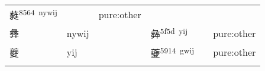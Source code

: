 \documentclass[14pt,a4paper]{scrartcl}
\begin{document}
\begin{longtable}[c]{@{}llllll@{}}
\begin{minipage}[t]{0.14\columnwidth}\raggedright\strut
蕤\textsuperscript{8564~nywij}
\strut\end{minipage} &
\begin{minipage}[t]{0.14\columnwidth}\raggedright\strut
\strut\end{minipage} &
\begin{minipage}[t]{0.14\columnwidth}\raggedright\strut
pure:other
\strut\end{minipage}\tabularnewline
\begin{minipage}[t]{0.14\columnwidth}\raggedright\strut
彝
\strut\end{minipage} &
\begin{minipage}[t]{0.14\columnwidth}\raggedright\strut
nywij
\strut\end{minipage} &
\begin{minipage}[t]{0.14\columnwidth}\raggedright\strut
\strut\end{minipage} &
\begin{minipage}[t]{0.14\columnwidth}\raggedright\strut
彝\textsuperscript{5f5d~yij}
\strut\end{minipage} &
\begin{minipage}[t]{0.14\columnwidth}\raggedright\strut
\strut\end{minipage} &
\begin{minipage}[t]{0.14\columnwidth}\raggedright\strut
pure:other
\strut\end{minipage}\tabularnewline
\begin{minipage}[t]{0.14\columnwidth}\raggedright\strut
夔
\strut\end{minipage} &
\begin{minipage}[t]{0.14\columnwidth}\raggedright\strut
yij
\strut\end{minipage} &
\begin{minipage}[t]{0.14\columnwidth}\raggedright\strut
\strut\end{minipage} &
\begin{minipage}[t]{0.14\columnwidth}\raggedright\strut
夔\textsuperscript{5914~gwij}
\strut\end{minipage} &
\begin{minipage}[t]{0.14\columnwidth}\raggedright\strut
\strut\end{minipage} &
\begin{minipage}[t]{0.14\columnwidth}\raggedright\strut
pure:other
\strut\end{minipage}\tabularnewline
\begin{minipage}[t]{0.14\columnwidth}\raggedright\strut

\end{minipage}
\end{longtable}
\end{document}
